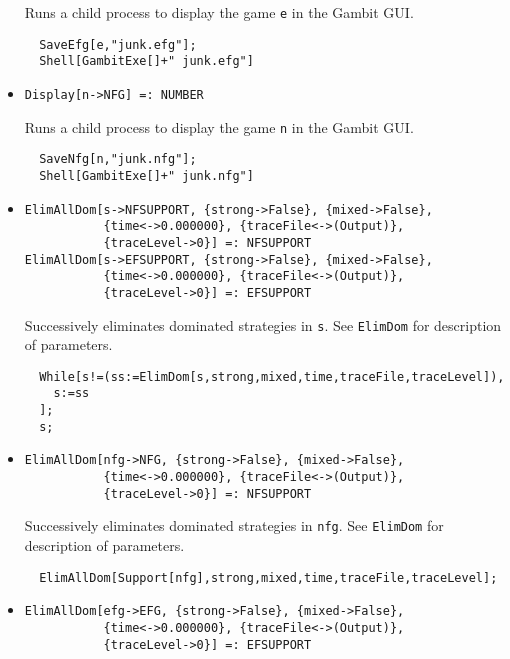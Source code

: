 \begin{itemize}
\bd 
Runs a child process to display the game \verb+e+ in the Gambit GUI. 
\begin{verbatim}
  SaveEfg[e,"junk.efg"];
  Shell[GambitExe[]+" junk.efg"]
\end{verbatim} 
\ed

\item{}
\protect \large \begin{verbatim}
Display[n->NFG] =: NUMBER 
\end{verbatim}\normalsize

\bd 
Runs a child process to display the game \verb+n+ in the Gambit GUI. 
\begin{verbatim}
  SaveNfg[n,"junk.nfg"];
  Shell[GambitExe[]+" junk.nfg"]
\end{verbatim} 
\ed


\item{}
\protect \large \begin{verbatim}
ElimAllDom[s->NFSUPPORT, {strong->False}, {mixed->False}, 
           {time<->0.000000}, {traceFile<->(Output)}, 
           {traceLevel->0}] =: NFSUPPORT 
ElimAllDom[s->EFSUPPORT, {strong->False}, {mixed->False}, 
           {time<->0.000000}, {traceFile<->(Output)}, 
           {traceLevel->0}] =: EFSUPPORT 
\end{verbatim}\normalsize

\bd 
Successively eliminates dominated strategies in \verb+s+. See
\verb+ElimDom+ for description of parameters.  
\begin{verbatim}
  While[s!=(ss:=ElimDom[s,strong,mixed,time,traceFile,traceLevel]),
    s:=ss
  ];
  s;
\end{verbatim} 
\ed

\item{}
\protect \large \begin{verbatim}
ElimAllDom[nfg->NFG, {strong->False}, {mixed->False}, 
           {time<->0.000000}, {traceFile<->(Output)}, 
           {traceLevel->0}] =: NFSUPPORT 
\end{verbatim}\normalsize

\bd 
Successively eliminates dominated strategies in \verb+nfg+.  See
\verb+ElimDom+ for description of parameters.  
\begin{verbatim}
  ElimAllDom[Support[nfg],strong,mixed,time,traceFile,traceLevel];
\end{verbatim} 
\ed

\item{}
\protect \large \begin{verbatim}
ElimAllDom[efg->EFG, {strong->False}, {mixed->False}, 
           {time<->0.000000}, {traceFile<->(Output)}, 
           {traceLevel->0}] =: EFSUPPORT 
\end{verbatim}\normalsize


\end{itemize}

